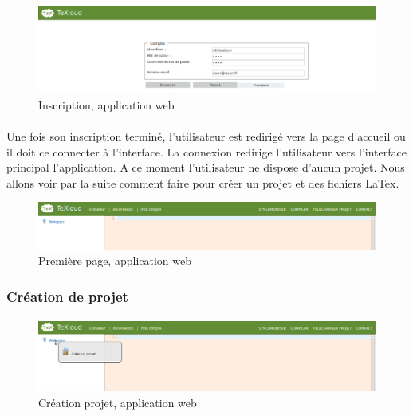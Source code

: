 \documentclass[a4paper,12pt]{article}
\begin{document}
\begin{figure}[!ht]
\begin{center}
  \includegraphics[width=1\textwidth]{./images/screenshot/Inscription.png}
\end{center}
  \caption{Inscription, application web}
  \label{inscriptionWeb}
\end{figure}

\paragraph*{}
Une fois son inscription terminé, l'utilisateur est redirigé vers la page d'accueil ou il doit ce connecter à l'interface. La connexion redirige l'utilisateur vers l'interface principal l'application. A ce moment l'utilisateur ne dispose d'aucun projet. Nous allons voir par la suite comment faire pour créer un projet et des fichiers LaTex.

\begin{figure}[!ht]
\begin{center}
  \includegraphics[width=1\textwidth]{./images/screenshot/PageEdition1.png}
\end{center}
  \caption{Première page, application web}
  \label{firstPageWeb}
\end{figure}

\subsubsection{Création de projet}
\paragraph*{}


\begin{figure}[!ht]
\begin{center}
  \includegraphics[width=1\textwidth]{./images/screenshot/CreeProjet.png}
\end{center}
  \caption{Création projet, application web}
  \label{createProjectWeb}
\end{figure}
\end{document}
